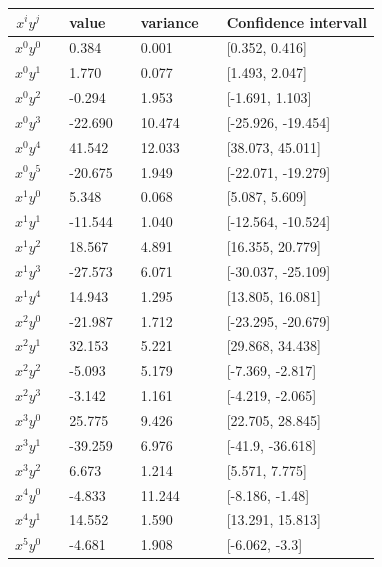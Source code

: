 \pagebreak

  \begin{center}
 \label{tab:Confidenceintervall_Ridge}
 \begin{tabularx}{\textwidth}{c X l X l X l }
     \hline
     \hline
     $x^iy^j$ && value && variance && Confidence intervall \\
     \hline
$x^0y^0$     && 0.384    && 0.001   && [0.352, 0.416]     \\
$x^0y^1$     && 1.770    && 0.077   && [1.493, 2.047]     \\
$x^0y^2$     && -0.294   && 1.953   && [-1.691, 1.103]    \\
$x^0y^3$     && -22.690  && 10.474  && [-25.926, -19.454] \\
$x^0y^4$     && 41.542   && 12.033  && [38.073, 45.011]   \\
$x^0y^5$     && -20.675  && 1.949   && [-22.071, -19.279] \\
$x^1y^0$     && 5.348    && 0.068   && [5.087, 5.609]     \\
$x^1y^1$     && -11.544  && 1.040   && [-12.564, -10.524] \\
$x^1y^2$     && 18.567   && 4.891   && [16.355, 20.779]   \\
$x^1y^3$     && -27.573  && 6.071   && [-30.037, -25.109] \\
$x^1y^4$     && 14.943   && 1.295   && [13.805, 16.081]   \\
$x^2y^0$     && -21.987  && 1.712   && [-23.295, -20.679] \\
$x^2y^1$     && 32.153   && 5.221   && [29.868, 34.438]   \\
$x^2y^2$     && -5.093   && 5.179   && [-7.369, -2.817]   \\
$x^2y^3$     && -3.142   && 1.161   && [-4.219, -2.065]   \\
$x^3y^0$     && 25.775   && 9.426   && [22.705, 28.845]   \\
$x^3y^1$     && -39.259  && 6.976   && [-41.9, -36.618]   \\
$x^3y^2$     && 6.673    && 1.214   && [5.571, 7.775]     \\
$x^4y^0$     && -4.833   && 11.244  && [-8.186, -1.48]    \\
$x^4y^1$     && 14.552   && 1.590   && [13.291, 15.813]   \\
$x^5y^0$     && -4.681   && 1.908   && [-6.062, -3.3]    \\ 
    \hline
 \end{tabularx}
 \end{center}      

